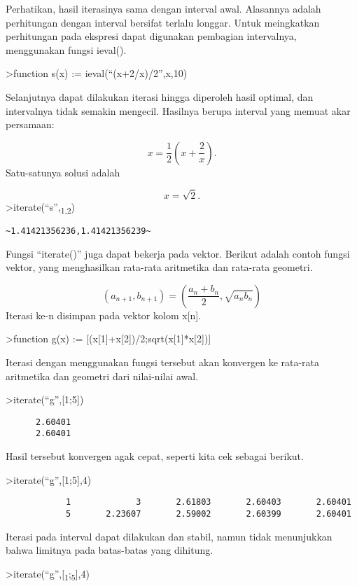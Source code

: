 \documentclass[
]{book}
\begin{document}
Perhatikan, hasil iterasinya sama dengan interval awal. Alasannya adalah perhitungan dengan interval bersifat terlalu longgar. Untuk meingkatkan perhitungan pada ekspresi dapat digunakan pembagian intervalnya, menggunakan fungsi ieval().

\textgreater function s(x) := ieval(``(x+2/x)/2'',x,10)

Selanjutnya dapat dilakukan iterasi hingga diperoleh hasil optimal, dan intervalnya tidak semakin mengecil. Hasilnya berupa interval yang memuat akar persamaan:

\[x = \frac{1}{2} \left( x + \frac{2}{x} \right).\]Satu-satunya solusi adalah

\[x = \sqrt2.\]\textgreater iterate(``s'',\textsubscript{1,2})

\begin{verbatim}
~1.41421356236,1.41421356239~
\end{verbatim}

Fungsi ``iterate()'' juga dapat bekerja pada vektor. Berikut adalah contoh fungsi vektor, yang menghasilkan rata-rata aritmetika dan rata-rata geometri.

\[(a_{n+1},b_{n+1}) = \left( \frac{a_n+b_n}{2}, \sqrt{a_nb_n} \right)\]Iterasi ke-n disimpan pada vektor kolom x{[}n{]}.

\textgreater function g(x) := {[}(x{[}1{]}+x{[}2{]})/2;sqrt(x{[}1{]}*x{[}2{]}){]}

Iterasi dengan menggunakan fungsi tersebut akan konvergen ke rata-rata aritmetika dan geometri dari nilai-nilai awal.

\textgreater iterate(``g'',{[}1;5{]})

\begin{verbatim}
      2.60401 
      2.60401 
\end{verbatim}

Hasil tersebut konvergen agak cepat, seperti kita cek sebagai berikut.

\textgreater iterate(``g'',{[}1;5{]},4)

\begin{verbatim}
            1             3       2.61803       2.60403       2.60401 
            5       2.23607       2.59002       2.60399       2.60401 
\end{verbatim}

Iterasi pada interval dapat dilakukan dan stabil, namun tidak menunjukkan bahwa limitnya pada batas-batas yang dihitung.

\textgreater iterate(``g'',{[}\textsubscript{1};\textsubscript{5}{]},4)
\end{document}
